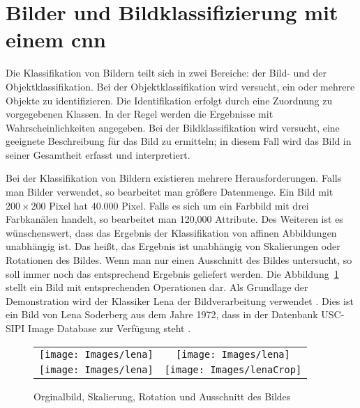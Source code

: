 %
%




\section{Bilder und Bildklassifizierung mit einem \ac{cnn}}


Die Klassifikation von Bildern teilt sich in zwei Bereiche: der Bild- und der Objektklassifikation. 
Bei der Objektklassifikation wird versucht, ein oder mehrere Objekte zu identifizieren. Die Identifikation erfolgt durch eine Zuordnung zu vorgegebenen Klassen. In der Regel werden die Ergebnisse mit Wahrscheinlichkeiten angegeben. Bei der Bildklassifikation wird versucht, eine geeignete Beschreibung für das Bild zu ermitteln; in diesem Fall wird das Bild in seiner Gesamtheit erfasst und interpretiert. \cite{Zhiqiang:2017}

Bei der Klassifikation von Bildern existieren mehrere Herausforderungen. Falls man Bilder verwendet, so bearbeitet man größere Datenmenge. Ein Bild mit $200 \times 200$ Pixel hat 40.000 Pixel. Falls es sich um ein Farbbild mit drei Farbkanälen handelt, so bearbeitet man 120,000 Attribute. 
Des Weiteren ist es wünschenswert, dass das Ergebnis der Klassifikation von affinen Abbildungen unabhängig ist. Das heißt, das Ergebnis ist unabhängig von Skalierungen oder Rotationen des Bildes. Wenn man nur einen Ausschnitt des Bildes untersucht, so soll immer noch das entsprechend Ergebnis geliefert werden. Die Abbildung~\ref{img:Herausforderungen} stellt ein Bild mit entsprechenden Operationen dar.  
Als Grundlage der Demonstration wird der Klassiker \glqq Lena\grqq{} der Bildverarbeitung verwendet \cite{Munson:1996}. Dies ist ein Bild von Lena Soderberg aus dem Jahre 1972, dass in der Datenbank USC-SIPI Image Database zur Verfügung steht \cite{Weber:1997}.



\begin{figure}[!h]
	\centering
	\begin{tabular}{cc}
		\texttt{[image: Images/lena]}    &
		\texttt{[image: Images/lena]}    \\
		\texttt{[image: Images/lena]}    &
		\texttt{[image: Images/lenaCrop]}    \\
	\end{tabular}
	\caption{Orginalbild, Skalierung, Rotation und Ausschnitt des Bildes}\label{img:Herausforderungen}
\end{figure}



